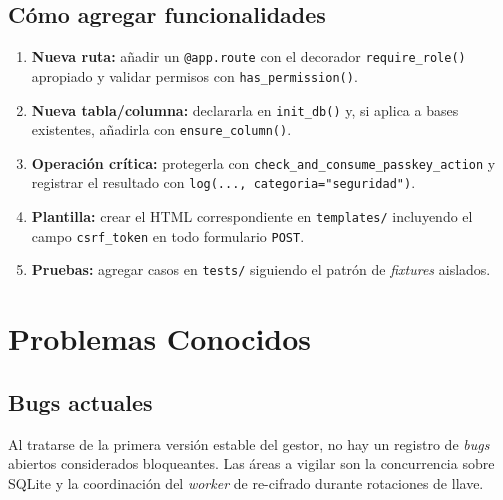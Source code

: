 \documentclass[10pt,letterpaper]{report}
\begin{document}
\section{C\'omo agregar funcionalidades}
\begin{enumerate}
  \item \textbf{Nueva ruta:} a\~nadir un \texttt{@app.route} con el decorador \texttt{require\_role()}
  apropiado y validar permisos con \texttt{has\_permission()}.
  \item \textbf{Nueva tabla/columna:} declararla en \texttt{init\_db()} y, si aplica a bases
  existentes, a\~nadirla con \texttt{ensure\_column()}.
  \item \textbf{Operaci\'on cr\'itica:} protegerla con \texttt{check\_and\_consume\_passkey\_action} y
  registrar el resultado con \texttt{log(..., categoria="seguridad")}.
  \item \textbf{Plantilla:} crear el HTML correspondiente en \texttt{templates/} incluyendo el campo
  \texttt{csrf\_token} en todo formulario \texttt{POST}.
  \item \textbf{Pruebas:} agregar casos en \texttt{tests/} siguiendo el patr\'on de \emph{fixtures}
  aislados.
\end{enumerate}

\chapter{Problemas Conocidos}

\section{Bugs actuales}
Al tratarse de la primera versi\'on estable del gestor, no hay un registro de \emph{bugs} abiertos
considerados bloqueantes. Las \'areas a vigilar son la concurrencia sobre SQLite y la coordinaci\'on
del \emph{worker} de re-cifrado durante rotaciones de llave.
\end{document}
